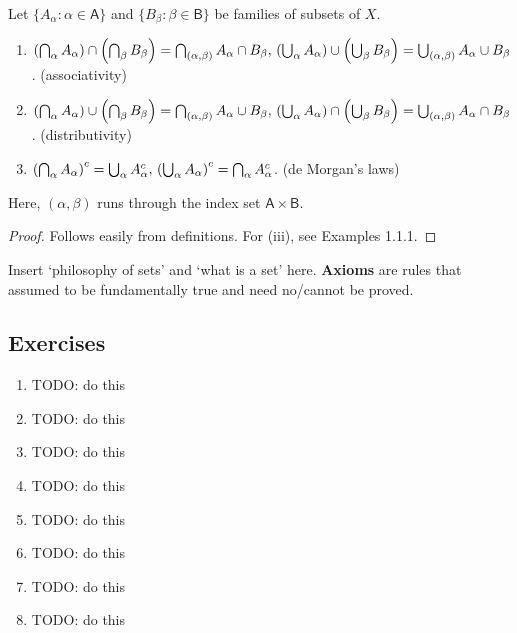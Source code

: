 \begin{proposition} Let $\{A_\alpha : \alpha \in \mathsf{A}\}$ and $\{B_\beta : \beta \in \mathsf{B}\}$ be families of subsets of $X$.
    \begin{enumerate}[label=(\roman*)]
        \item $\left(\bigcap_\alpha A_\alpha\right) \cap \left(\bigcap_\beta B_\beta\right) = \bigcap_{(\alpha,\beta)} A_\alpha \cap B_\beta,\\
        \left(\bigcup_\alpha A_\alpha\right) \cup \left(\bigcup_\beta B_\beta\right) = \bigcup_{(\alpha,\beta)} A_\alpha \cup B_\beta$. (associativity)

        \item $\left(\bigcap_\alpha A_\alpha\right) \cup \left(\bigcap_\beta B_\beta\right) = \bigcap_{(\alpha,\beta)} A_\alpha \cup B_\beta,\\
        \left(\bigcup_\alpha A_\alpha\right) \cap \left(\bigcup_\beta B_\beta\right) = \bigcup_{(\alpha,\beta)} A_\alpha \cap B_\beta$. (distributivity)

        \item $\left(\bigcap_\alpha A_\alpha\right)^c = \bigcup_\alpha A_\alpha^c,\\
        \left(\bigcup_\alpha A_\alpha\right)^c = \bigcap_\alpha A_\alpha^c$. (de Morgan's laws)
    \end{enumerate}

    Here, $(\alpha, \beta)$ runs through the index set $\mathsf{A} \times \mathsf{B}$.

    \begin{proof}
        Follows easily from definitions. For (iii), see Examples 1.1.1.
    \end{proof}
\end{proposition}

\begin{remark}
    Insert `philosophy of sets' and `what is a set' here. \textbf{Axioms} are rules that assumed to be fundamentally true and need no/cannot be proved.
\end{remark}

\subsection*{Exercises}

\begin{enumerate}
    \item TODO: do this
    \item TODO: do this
    \item TODO: do this
    \item TODO: do this
    \item TODO: do this
    \item TODO: do this
    \item TODO: do this
    \item TODO: do this
\end{enumerate}